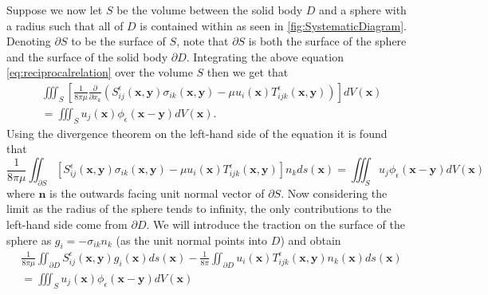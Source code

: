 Suppose we now let $S$ be the volume between the solid body $D$ and a sphere with a radius such that all of $D$ is contained within as seen in \cref{fig:SystematicDiagram}. Denoting $\partial S$ to be the surface of $S$, note that $\partial S$ is both the surface of the sphere and the surface of the solid body $\partial D$. Integrating the above equation \cref{eq:reciprocalrelation} over the volume $S$ then we get that
\begin{equation*}
\begin{aligned}
      &\iiint_{S} \left[\frac{1}{8\pi\mu}\frac{\partial}{\partial x_k}(S^\epsilon_{ij}\left(\bm{x}, \bm{y}\right)\sigma_{ik}\left(\bm{x}, \bm{y}\right) - \mu u_i(\bm{x}) T^\epsilon_{ijk}\left(\bm{x}, \bm{y}\right))\right] dV(\bm{x}) \\
      &= \iiint_{S} u_j(\bm{x})\phi_\epsilon(\bm{x}-\bm{y}) dV(\bm{x}).
\end{aligned}
\end{equation*}
Using the divergence theorem on the left-hand side of the equation it is found that
\begin{equation*}
  \frac{1}{8\pi\mu}\iint_{\partial S} \left[S^\epsilon_{ij}\left(\bm{x}, \bm{y}\right)\sigma_{ik}\left(\bm{x}, \bm{y}\right) - \mu u_i(\bm{x}) T^\epsilon_{ijk}\left(\bm{x}, \bm{y}\right)\right]n_k ds(\bm{x}) = \iiint_{S} u_j\phi_\epsilon(\bm{x}-\bm{y}) dV(\bm{x})
\end{equation*}
where $\bm{n}$ is the outwards facing unit normal vector of $\partial S$. Now considering the limit as the radius of the sphere tends to infinity, the only contributions to the left-hand side come from $\partial D$. We will introduce the traction on the surface of the sphere as $g_{i} = -\sigma_{ik}n_k$ (as the unit normal points into $D$) and obtain
\begin{equation}
\begin{aligned}
    \label{eq:BIE3}
    &\frac{1}{8\pi\mu}\iint_{\partial D} S^\epsilon_{ij}\left(\bm{x}, \bm{y}\right)g_i(\bm{x}) ds(\bm{x}) - \frac{1}{8\pi}\iint_{\partial D} u_i(\bm{x}) T^\epsilon_{ijk}\left(\bm{x}, \bm{y}\right)n_k(\bm{x}) ds(\bm{x}) \\
    &= \iiint_{S} u_j(\bm{x})\phi_\epsilon(\bm{x}-\bm{y}) dV(\bm{x})
\end{aligned}
\end{equation}

